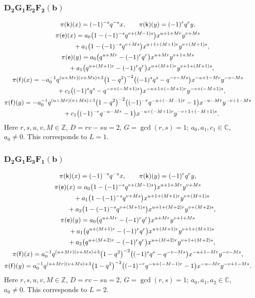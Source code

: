 \documentclass[pdftex]{sigma}
\numberwithin{equation}{section}
\begin{document}
\subsubsection*{$\boldsymbol{D_2G_1E_2F_2(b)}$}
\begin{gather*}
\pi(\mathsf{k})(x)= (-1)^{-s}q^{-s}x ,\qquad\pi(\mathsf{k})(y)=(-1)^rq^ry ,\\
\pi(\mathsf{e})(x)= a_0\big(1-(-1)^{-s}q^{v+(M-1)s}\big)x^{u+1+Mr}y^{v+Ms}\\
\hphantom{\pi(\mathsf{e})(x)=}{} + a_1\big(1-(-1)^{-s}q^{v+Ms}\big)x^{u+1+(M+1)r}y^{v+(M+1)s} ,\\
\pi(\mathsf{e})(y)= a_0\big(q^{u+Mr}-(-1)^rq^r\big)x^{u+Mr}y^{v+1+Ms}\\
\hphantom{\pi(\mathsf{e})(y)=}{} + a_1\big(q^{u+(M+1)r}-(-1)^rq^r\big)x^{u+(M+1)r}y^{v+1+(M+1)s} ,\\
\pi(\mathsf{f})(x)= -a_0^{-1}q^{(u+Mr)(v+Ms)+3}\big(1-q^2\big)^{-2}\big((-1)^sq^s-q^{-v-Ms}\big)x^{-u+1-Mr}y^{-v-Ms}\\
\hphantom{\pi(\mathsf{f})(x)=}{} + c_1\big((-1)^sq^s-q^{-v+(-M+1)s}\big)x^{-u+1+(-M+1)r}y^{-v+(-M+1)s} ,\\
\pi(\mathsf{f})(y)= -a_0^{-1}q^{(u+Mr)(v+Ms)+3}\big(1-q^2\big)^{-2}\big((-1)^{-r}q^{-u+(-M-1)r}-1\big) x^{-u-Mr}y^{-v+1-Ms}\\
\hphantom{\pi(\mathsf{f})(y)=}{}+ c_1\big((-1)^{-r}q^{-u-Mr}-1\big)x^{-u+(-M+1)r}y^{-v+1+(-M+1)s} .
\end{gather*}
Here $r,s,u,v,M\in\mathbb{Z}$, $D=rv-su=2$, $G=\operatorname{gcd}(r,s)=1$; $a_0,a_1,c_1\in\mathbb{C}$, $a_0\ne 0$. This corresponds to $L=1$.

\subsubsection*{$\boldsymbol{D_2G_1E_3F_1(b)}$}
\begin{gather*}
\pi(\mathsf{k})(x)= (-1)^{-s}q^{-s}x ,\qquad\pi(\mathsf{k})(y)=(-1)^rq^ry ,\\
\pi(\mathsf{e})(x)= a_0\big(1-(-1)^{-s}q^{v+(M-1)s}\big)x^{u+1+Mr}y^{v+Ms}\\
\hphantom{\pi(\mathsf{e})(x)=}{} + a_1\big(1-(-1)^{-s}q^{v+Ms}\big)x^{u+1+(M+1)r}y^{v+(M+1)s}\\
\hphantom{\pi(\mathsf{e})(x)=}{} + a_2\big(1-(-1)^{-s}q^{v+(M+1)s}\big)x^{u+1+(M+2)r}y^{v+(M+2)s} ,\\
\pi(\mathsf{e})(y)= a_0\big(q^{u+Mr}-(-1)^rq^r\big)x^{u+Mr}y^{v+1+Ms}\\
\hphantom{\pi(\mathsf{e})(y)=}{} + a_1\big(q^{u+(M+1)r}-(-1)^rq^r\big)x^{u+(M+1)r}y^{v+1+(M+1)s}\\
\hphantom{\pi(\mathsf{e})(y)=}{} + a_2\big(q^{u+(M+2)r}-(-1)^rq^r\big)x^{u+(M+2)r}y^{v+1+(M+2)s} ,\\
\pi(\mathsf{f})(x)= a_0^{-1}q^{(u+Mr)(v+Ms)+3}\big(1-q^2\big)^{-2}\big((-1)^sq^s-q^{-v-Ms}\big)x^{-u+1-Mr}y^{-v-Ms} ,\\
\pi(\mathsf{f})(y)= a_0^{-1}q^{(u+Mr)(v+Ms)+3}\big(1-q^2\big)^{-2}\big((-1)^{-r}q^{-u+(-M-1)r}-1\big)x^{-u-Mr}y^{-v+1-Ms} .
\end{gather*}
Here $r,s,u,v,M\in\mathbb{Z}$, $D=rv-su=2$, $G=\operatorname{gcd}(r,s)=1$; $a_0,a_1,a_2\in\mathbb{C}$, $a_0\ne 0$. This corresponds to $L=2$.
\end{document}

